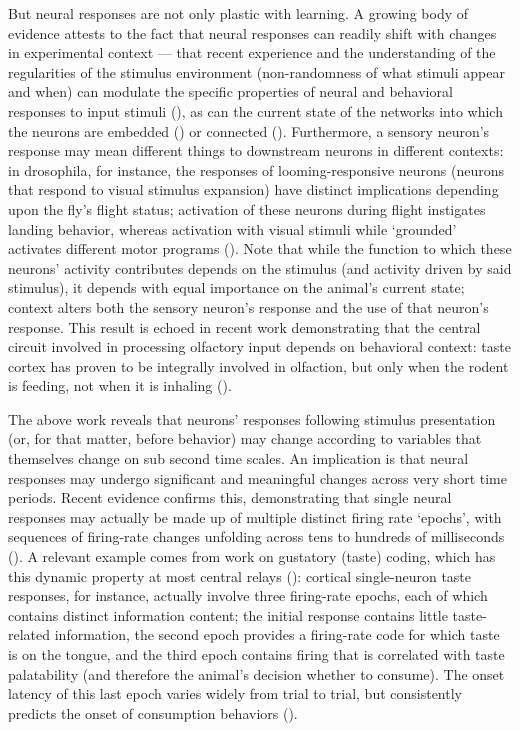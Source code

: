 \begin{refsection}
But neural responses are not only plastic with learning. A growing body of evidence attests to the fact that neural responses can readily shift with changes in experimental context --- that recent experience and the understanding of the regularities of the stimulus environment (non-randomness of what stimuli appear and when) can modulate the specific properties of neural and behavioral responses to input stimuli (\cite{flores2018a,noudoost2017a}), as can the current state of the networks into which the neurons are embedded (\cite{sakata2016a}) or connected (\cite{mante2013a,safaai2015a}). Furthermore, a sensory neuron’s response may mean different things to downstream neurons in different contexts: in drosophila, for instance, the responses of looming-responsive neurons (neurons that respond to visual stimulus expansion) have distinct implications depending upon the fly’s flight status; activation of these neurons during flight instigates landing behavior, whereas activation with visual stimuli while ‘grounded’ activates different motor programs (\cite{ache2019a}). Note that while the function to which these neurons’ activity contributes depends on the stimulus (and activity driven by said stimulus), it depends with equal importance on the animal’s current state; context alters both the sensory neuron’s response and the use of that neuron’s response. This result is echoed in recent work demonstrating that the central circuit involved in processing olfactory input depends on behavioral context: taste cortex has proven to be integrally involved in olfaction, but only when the rodent is feeding, not when it is inhaling (\cite{blankenship2019a}).

The above work reveals that neurons’ responses following stimulus presentation (or, for that matter, before behavior) may change according to variables that themselves change on sub second time scales. An implication is that neural responses may undergo significant and meaningful changes across very short time periods. Recent evidence confirms this, demonstrating that single neural responses may actually be made up of multiple distinct firing rate ‘epochs’, with sequences of firing-rate changes unfolding across tens to hundreds of milliseconds (\cite{guo2015a,sauerbrei2020a,sugase1999a}). A relevant example comes from work on gustatory (taste) coding, which has this dynamic property at most central relays (\cite{baez-santiago2016a,fontanini2008a,li2016a,li2013a}): cortical single-neuron taste responses, for instance, actually involve three firing-rate epochs, each of which contains distinct information content; the initial response contains little taste-related information, the second epoch provides a firing-rate code for which taste is on the tongue, and the third epoch contains firing that is correlated with taste palatability (and therefore the animal’s decision whether to consume). The onset latency of this last epoch varies widely from trial to trial, but consistently predicts the onset of consumption behaviors (\cite{sadacca2012a}).


\end{refsection}
